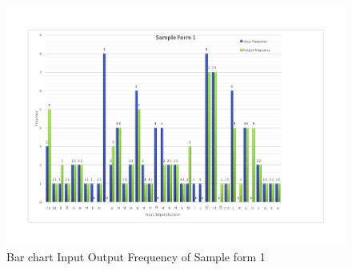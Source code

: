 \begin{figure}[H]
\centering
\includegraphics[width=1\textwidth]{Bform1.pdf}
\caption {Bar chart Input Output Frequency of Sample form 1}
\label {fig:Bbar1}
\end{figure}




